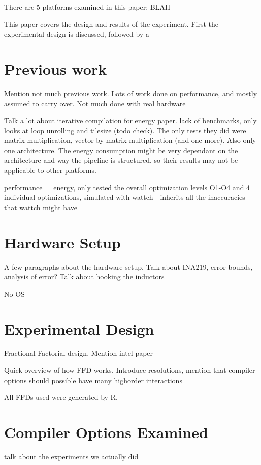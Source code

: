 \documentclass[twocolumn]{article}
\begin{document}
There are 5 platforms examined in this paper:
BLAH

This paper covers the design and results of the experiment. First the experimental design is discussed, followed by a

\section*{Previous work}

Mention not much previous work. Lots of work done on performance, and mostly assumed to carry over. Not much done with real hardware

Talk a lot about iterative compilation for energy paper. lack of benchmarks, only looks at loop unrolling and tilesize (todo check). The only tests they did were matrix multiplication, vector by matrix multiplication (and one more). Also only one architecture. The energy consumption might be very dependant on the architecture and way the pipeline is structured, so their results may not be applicable to other platforms.

performance==energy, only tested the overall optimization levels O1-O4 and 4 individual optimizations, simulated with wattch - inherits all the inaccuracies that wattch might have

\section*{Hardware Setup}

A few paragraphs about the hardware setup.
Talk about INA219, error bounds, analysis of error?
Talk about hooking the inductors

No OS

\section*{Experimental Design}

Fractional Factorial design. Mention intel paper

Quick overview of how FFD works. Introduce resolutions, mention that compiler options should possible have many highorder interactions

All FFDs used were generated by R.

\section*{Compiler Options Examined}

talk about the experiments we actually did
\end{document}
